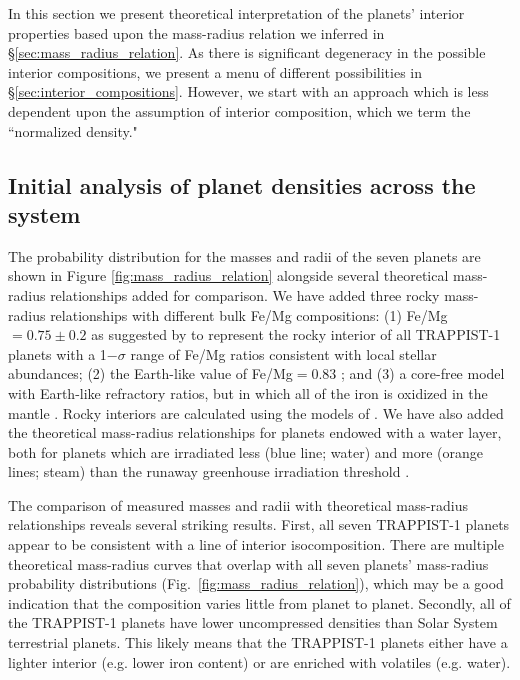 \documentclass[twocolumn]{aastex63}
\begin{document}
In this section we present theoretical interpretation of the planets'
interior properties based upon the mass-radius relation we inferred in \S \ref{sec:mass_radius_relation}.  As there is significant degeneracy in the possible interior compositions, we present a menu of different possibilities in \S \ref{sec:interior_compositions}.  However, we start with an approach which is less dependent upon the assumption of interior composition, which we term the ``normalized density."

\subsection{Initial analysis of planet densities across the system}

The probability distribution for the masses and radii of the seven planets are shown in Figure \ref{fig:mass_radius_relation} alongside several theoretical mass-radius relationships added for comparison. 
We have added three rocky mass-radius relationships with different bulk Fe/Mg compositions:  (1) Fe/Mg$ =0.75{\pm} 0.2$ as suggested by \citet{Unterborn2018a} to represent the rocky interior of all TRAPPIST-1 planets with a 1$-\sigma$ range of Fe/Mg ratios consistent with local stellar abundances;  (2) the Earth-like value of Fe/Mg$ = 0.83$ \citep{Lodders2009}; and (3) a core-free model with Earth-like refractory ratios, but in which all of the iron is oxidized in the mantle \citep{ElkinsTanton2008}. Rocky interiors are calculated using the models of \citet{Dorn2016}. We have also added the theoretical mass-radius relationships for planets endowed with a water layer, both for planets which are irradiated less (blue line; water) and more (orange lines; steam) than the runaway greenhouse irradiation threshold \citep{Turbet2020}.

The comparison of measured masses and radii with theoretical mass-radius relationships reveals several striking results. First, all seven TRAPPIST-1 planets appear to be consistent with a line of interior isocomposition. There are multiple theoretical mass-radius curves that overlap with all seven planets' mass-radius probability distributions (Fig.\ \ref{fig:mass_radius_relation}), which may be a good indication that the composition varies little from planet to planet. Secondly, all of the TRAPPIST-1 planets have lower uncompressed densities than Solar System terrestrial planets. This likely means that the TRAPPIST-1 planets either have a lighter interior (e.g. lower iron content) or are enriched with volatiles (e.g. water).
\end{document}

